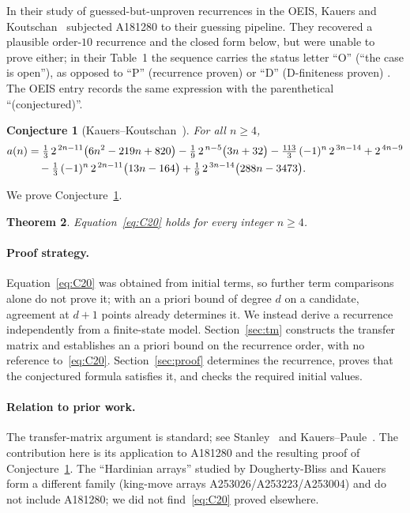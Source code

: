 \documentclass[11pt]{article}
\newtheorem{theorem}{Theorem}[section]
\newtheorem{conjecture}[theorem]{Conjecture}
\theoremstyle{definition}
\begin{document}
In their study of guessed-but-unproven recurrences in the OEIS, Kauers and
Koutschan~\cite{KK23} subjected A181280 to their guessing pipeline. They recovered a
plausible order-$10$ recurrence and the closed form below, but were unable to prove
either; in their Table~1 the sequence carries the status letter ``O'' (``the case is
open''), as opposed to ``P'' (recurrence proven) or ``D'' (D-finiteness proven)
\cite[\S6.5]{KK23}. The OEIS entry records the same expression with the parenthetical
``(conjectured)''.

\begin{conjecture}[Kauers--Koutschan~{\cite[Conjecture 20]{KK23}}]\label{conj:KK}
For all $n\ge 4$,
\begin{align}
  a(n)
  &= \tfrac{1}{3}\,2^{\,2n-11}\bigl(6n^2-219n+820\bigr)
   - \tfrac{1}{9}\,2^{\,n-5}\bigl(3n+32\bigr)
   - \tfrac{113}{3}\,(-1)^n\,2^{\,3n-14}
   + 2^{\,4n-9} \notag\\
  &\quad{}- \tfrac{1}{3}\,(-1)^n\,2^{\,2n-11}\bigl(13n-164\bigr)
   + \tfrac{1}{9}\,2^{\,3n-14}\bigl(288n-3473\bigr).
  \label{eq:C20}
\end{align}
\end{conjecture}

\noindent We prove Conjecture~\ref{conj:KK}.

\begin{theorem}\label{thm:main}
Equation~\eqref{eq:C20} holds for every integer $n\ge 4$.
\end{theorem}

\paragraph{Proof strategy.}
Equation~\eqref{eq:C20} was obtained from initial terms, so further term comparisons alone do
not prove it; with an a priori bound of degree $d$ on a candidate, agreement at $d+1$ points
already determines it. We instead derive a recurrence independently from a finite-state model.
Section~\ref{sec:tm} constructs the transfer matrix and establishes an a priori bound on the
recurrence order, with no reference to~\eqref{eq:C20}. Section~\ref{sec:proof} determines the
recurrence, proves that the conjectured formula satisfies it, and checks the required initial
values.

\paragraph{Relation to prior work.}
The transfer-matrix argument is standard; see Stanley~\cite[Ch.~4]{EC1} and
Kauers--Paule~\cite[Ch.~4]{CT}. The contribution here is its application to A181280 and the
resulting proof of Conjecture~\ref{conj:KK}. The ``Hardinian arrays'' studied by
Dougherty-Bliss and Kauers~\cite{DBK23} form a different family (king-move arrays
A253026/A253223/A253004) and do not include A181280; we did not find~\eqref{eq:C20} proved
elsewhere.
\end{document}
